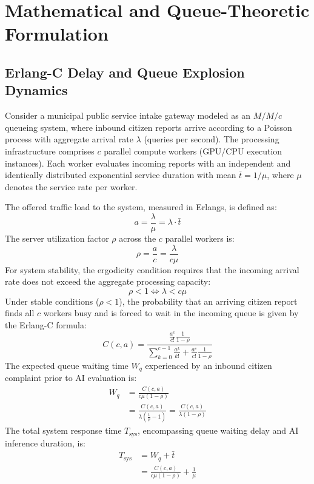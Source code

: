 \documentclass[journal,compsoc]{IEEEtran}
\begin{document}
\section{Mathematical and Queue-Theoretic Formulation}

\subsection{Erlang-C Delay and Queue Explosion Dynamics}
Consider a municipal public service intake gateway modeled as an $M/M/c$ queueing system, where inbound citizen reports arrive according to a Poisson process with aggregate arrival rate $\lambda$ (queries per second). The processing infrastructure comprises $c$ parallel compute workers (GPU/CPU execution instances). Each worker evaluates incoming reports with an independent and identically distributed exponential service duration with mean $\bar{t} = 1/\mu$, where $\mu$ denotes the service rate per worker.

The offered traffic load to the system, measured in Erlangs, is defined as:
\begin{equation}
a = \frac{\lambda}{\mu} = \lambda \cdot \bar{t}
\end{equation}
The server utilization factor $\rho$ across the $c$ parallel workers is:
\begin{equation}
\rho = \frac{a}{c} = \frac{\lambda}{c \mu}
\end{equation}
For system stability, the ergodicity condition requires that the incoming arrival rate does not exceed the aggregate processing capacity:
\begin{equation}
\rho < 1 \iff \lambda < c \mu
\end{equation}
Under stable conditions ($\rho < 1$), the probability that an arriving citizen report finds all $c$ workers busy and is forced to wait in the incoming queue is given by the Erlang-C formula:
\begin{equation}
C(c, a) = \frac{\frac{a^c}{c!} \frac{1}{1 - \rho}}{\sum_{k=0}^{c-1} \frac{a^k}{k!} + \frac{a^c}{c!} \frac{1}{1 - \rho}}
\end{equation}
The expected queue waiting time $W_q$ experienced by an inbound citizen complaint prior to AI evaluation is:
\begin{equation}
\begin{aligned}
W_q &= \frac{C(c, a)}{c \mu (1 - \rho)} \\
&= \frac{C(c, a)}{\lambda \left(\frac{1}{\rho} - 1\right)} = \frac{C(c, a)}{\lambda (1 - \rho)}
\end{aligned}
\end{equation}
The total system response time $T_{\text{sys}}$, encompassing queue waiting delay and AI inference duration, is:
\begin{equation}
\begin{aligned}
T_{\text{sys}} &= W_q + \bar{t} \\
&= \frac{C(c, a)}{c \mu (1 - \rho)} + \frac{1}{\mu}
\end{aligned}
\end{equation}
\end{document}
